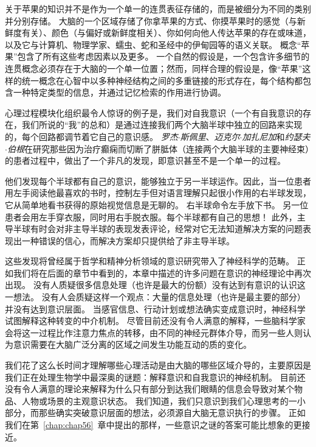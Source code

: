 关于苹果的知识并不是作为一个单一的连贯表征存储的，而是被细分为不同的类别并分别存储。
大脑的一个区域存储了你拿苹果的方式、你摸苹果时的感觉（与新鲜度有关）、颜色（与偏好或新鲜度相关）、你如何向他人传达苹果的存在或味道，以及它与计算机、物理学家、蠕虫、蛇和圣经中的伊甸园等的语义关联。
概念“苹果”包含了所有这些考虑因素以及更多。
一个自然的假设是，一个包含许多细节的连贯概念必须存在于大脑的一个单一位置；然而，同样合理的假设是，像“苹果”这样的统一概念在心智中以多种神经结构之间的多重链接的形式存在，每个结构都包含一种特定类型的信息，并通过记忆检索的作用进行协调。


心理过程模块化组织最令人惊讶的例子是，我们对自我意识（一个有自我意识的存在，我们所说的“我”的总和）是通过连接我们两个大脑半球中独立的回路来实现的，每个回路都调节着它自己的意识感。
\textit{罗杰$\cdot$斯佩里}、\textit{迈克尔$\cdot$加扎尼加}和\textit{约瑟夫$\cdot$伯根}在研究那些因为治疗癫痫而切断了胼胝体（连接两个大脑半球的主要神经束）的患者过程中，做出了一个非凡的发现，即意识甚至不是一个单一的过程。


他们发现每个半球都有自己的意识，能够独立于另一半球运作。因此，当一位患者用左手阅读他最喜欢的书时，控制左手但对语言理解只起很小作用的右半球发现，它从简单地看书获得的原始视觉信息是无聊的。
右半球命令左手放下书。
另一位患者会用左手穿衣服，同时用右手脱衣服。每个半球都有自己的思想！
此外，主导半球有时会对非主导半球的表现发表评论，经常对它无法知道解决方案的问题表现出一种错误的信心，而解决方案却只提供给了非主导半球。




这些发现将曾经属于哲学和精神分析领域的意识研究带入了神经科学的范畴。
正如我们将在后面的章节中看到的，本章中描述的许多问题在意识的神经理论中再次出现。
没有人质疑很多信息处理（也许是最大的份额）没有达到有意识的认识这一想法。
没有人会质疑这样一个观点：大量的信息处理（也许是最主要的部分）并没有达到意识层面。
当感官信息、行动计划或想法确实变成意识时，神经科学试图解释这种转变的中介机制。
尽管目前还没有令人满意的解释，一些脑科学家会将这一过程比作注意力焦点的转移，由不同的神经元群体介导，而另一些人则认为意识需要在大脑广泛分离的区域之间发生功能互动的质的变化。




我们花了这么长时间才理解哪些心理活动是由大脑的哪些区域介导的，主要原因是我们正在处理生物学中最深奥的谜题：解释意识和自我意识的神经机制。
目前还没有令人满意的理论来解释为什么只有部分到达我们眼睛的信息会导致对某个物品、人物或场景的主观意识状态。
我们知道，我们只意识到我们心理思考的一小部分，而那些确实突破意识层面的想法，必须源自大脑无意识执行的步骤。
正如我们在第~\ref{chap:chap56}~章中提出的那样，一些意识之谜的答案可能比想象的更接近。


